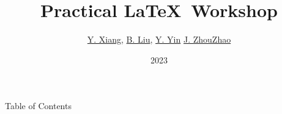 \documentclass[aspectratio=169]{beamer}
\title{Practical \LaTeX\ Workshop}
\author{\hyperlink{https://github.com/linsyking}{Y. Xiang}, \hyperlink{}{B. Liu}, \hyperlink{https://github.com/fakefred}{Y. Yin} \hyperlink{https://github.com/zzjc1234}{J. ZhouZhao}}
\institute{TechJI}
\date{2023}
\begin{document}
\begin{frame}
    \titlepage
\end{frame}

\begin{frame}{Table of Contents}
    \tableofcontents
\end{frame}


\end{document}
